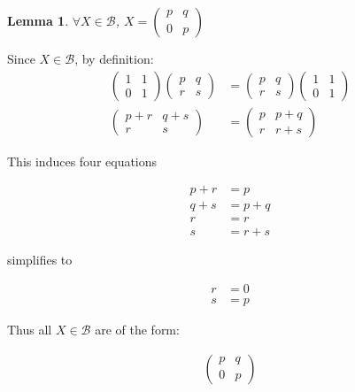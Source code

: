 \documentclass[12pt]{article}
\newtheorem{lemma}{Lemma}
\begin{document}
\begin{lemma}
$\forall X \in \mathcal{B}$, $X = \begin{pmatrix}p & q \\
0 & p
\end{pmatrix}$
\end{lemma}

Since $X \in \mathcal{B}$, by definition: \\

\begin{align*}
\begin{pmatrix}
1 & 1 \\
0 & 1
\end{pmatrix}
\begin{pmatrix}
p & q \\
r & s
\end{pmatrix} &=
\begin{pmatrix}
p & q \\
r & s
\end{pmatrix}
\begin{pmatrix}
1 & 1 \\
0 & 1
\end{pmatrix} \\
\begin{pmatrix}
p + r & q + s \\
r & s
\end{pmatrix} &=
\begin{pmatrix}
p & p + q \\
r & r + s
\end{pmatrix}
\end{align*}

This induces four equations

\begin{align*}
p + r &= p \\
q + s &= p + q \\
r &= r \\
s &= r + s
\end{align*}

simplifies to

\begin{align*}
r &= 0 \\
s &= p
\end{align*}

Thus all $X \in \mathcal{B}$ are of the form:

\begin{align*}
\begin{pmatrix}
p & q \\
0 & p
\end{pmatrix}
\end{align*}
\end{document}
